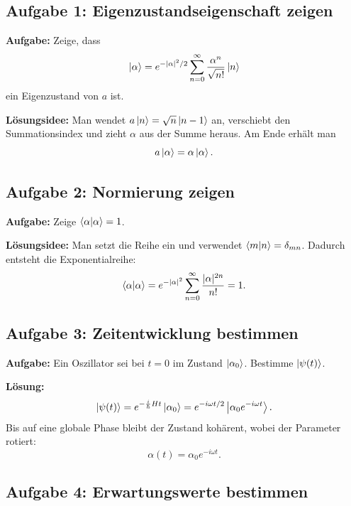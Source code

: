 \subsection{Aufgabe 1: Eigenzustandseigenschaft zeigen}

\begin{examplebox}
\textbf{Aufgabe:} Zeige, dass
\[
    \left|\alpha\right\rangle=e^{-|\alpha|^2/2}\sum_{n=0}^{\infty}\frac{\alpha^n}{\sqrt{n!}}\left|n\right\rangle
\]
ein Eigenzustand von \(a\) ist.

\textbf{Lösungsidee:} Man wendet \(a\left|n\right\rangle=\sqrt{n}\left|n-1\right\rangle\) an, verschiebt den Summationsindex und zieht \(\alpha\) aus der Summe heraus. Am Ende erhält man
\[
    a\left|\alpha\right\rangle=\alpha\left|\alpha\right\rangle.
\]
\end{examplebox}

\subsection{Aufgabe 2: Normierung zeigen}

\begin{examplebox}
\textbf{Aufgabe:} Zeige \(\left\langle\alpha\middle|\alpha\right\rangle=1\).

\textbf{Lösungsidee:} Man setzt die Reihe ein und verwendet \(\left\langle m\middle|n\right\rangle=\delta_{mn}\). Dadurch entsteht die Exponentialreihe:
\[
    \left\langle\alpha\middle|\alpha\right\rangle=e^{-|\alpha|^2}\sum_{n=0}^{\infty}\frac{|\alpha|^{2n}}{n!}=1.
\]
\end{examplebox}

\subsection{Aufgabe 3: Zeitentwicklung bestimmen}

\begin{examplebox}
\textbf{Aufgabe:} Ein Oszillator sei bei \(t=0\) im Zustand \(\left|\alpha_0\right\rangle\). Bestimme \(\left|\psi(t)\right\rangle\).

\textbf{Lösung:}
\[
    \left|\psi(t)\right\rangle=e^{-\frac{i}{\hbar}Ht}\left|\alpha_0\right\rangle
    =e^{-i\omega t/2}\left|\alpha_0e^{-i\omega t}\right\rangle.
\]
Bis auf eine globale Phase bleibt der Zustand kohärent, wobei der Parameter rotiert:
\[
    \alpha(t)=\alpha_0e^{-i\omega t}.
\]
\end{examplebox}

\subsection{Aufgabe 4: Erwartungswerte bestimmen}

